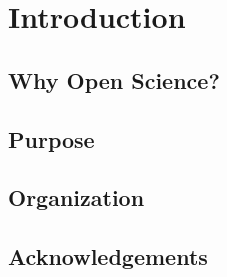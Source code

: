 \chapter{Introduction}

\section{Why Open Science?}

\section{Purpose}

\section{Organization}

\section{Acknowledgements}


